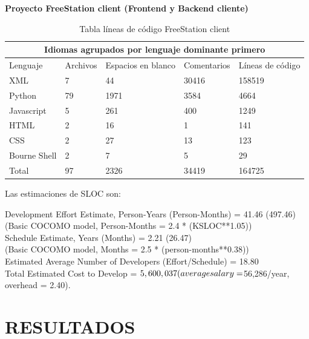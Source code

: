\textbf{Proyecto FreeStation client (Frontend y Backend cliente)}

\begin{table}[ht]
    \centering
\begin{tabular}{|l|l|l|l|l|}
  \hline
  \multicolumn{5}{|c|}{Idiomas agrupados por lenguaje dominante primero}
  \\
  \hline
  Lenguaje & Archivos & Espacios en blanco & Comentarios & Líneas de código \\
XML               &               7 &            44 &         30416 & 158519 \\
Python             &             79  &         1971  &         3584 & 4664 \\
Javascript          &             5   &         261   &         400 & 1249 \\
HTML                 &            2    &         16    &          1 & 141 \\
CSS                   &           2     &        27     &        13 & 123 \\
Bourne Shell           &          2      &        7      &        5 & 29 \\
Total                   &         97      &     2326      &    34419 & 164725 \\
  \hline
\end{tabular}
    \caption{Tabla líneas de código FreeStation client}
     \label{tab:slocclient}
\end{table}

\newpage

Las estimaciones de SLOC son:

Development Effort Estimate, Person-Years (Person-Months) = 41.46 (497.46) \\
 (Basic COCOMO model, Person-Months = 2.4 * (KSLOC**1.05)) \\
Schedule Estimate, Years (Months)                         = 2.21 (26.47) \\
 (Basic COCOMO model, Months = 2.5 * (person-months**0.38)) \\
Estimated Average Number of Developers (Effort/Schedule)  = 18.80 \\
Total Estimated Cost to Develop                           = $ 5,600,037 \\
 (average salary = $56,286/year, overhead = 2.40). \\

\section{\uppercase{Resultados}}

